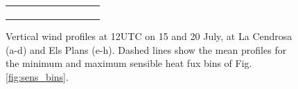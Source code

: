 \begin{figure}[hbtp]
{\begin{tabular}{@{}cccc@{}}
\begin{subfigure}[t]{0.283\textwidth}
        \end{subfigure} \\
    \end{tabular}
    }
    \caption{Vertical wind profiles at 12UTC on 15 and 20 July, at La Cendrosa (a-d) and Els Plans (e-h). Dashed lines show the mean profiles for the minimum and maximum sensible heat fux bins of Fig. \ref{fig:sens_bins}.}
    \label{fig:profiles_winds_sensbins}
\end{figure}

